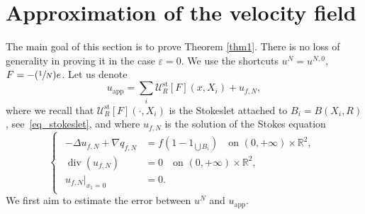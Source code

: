 \documentclass[10pt]{amsart}
\newcommand{\Psfrac}[2]{(\sfrac{#1}{#2})}
\newcommand{\app}{\mathrm{app}}
\newcommand{\st}{\mathrm{st}}
\renewcommand{\div}{\operatorname{div}}
\theoremstyle{plain}
\theoremstyle{definition}
\let\eps\varepsilon
\newcommand{\R}{\mathbb{R}}
\let\oldbigcup\bigcup
\begin{document}
\section{Approximation of the velocity field} \label{sec_approx}

The main goal of this section is to prove Theorem \ref{thm1}. There is no loss of generality in proving it in the case $\eps = 0$. We use the shortcuts $u^N = u^{N,0}$, $F=-\Psfrac{1}{N}e $. Let us denote\vspace*{-3pt}
\[
u_{\app}= \sum_i \mathcal{U}^{\st}_R\left[F\right](x,X_i)+ u_{f,N},
\]
where we recall that $\mathcal{U}^{\st}_R[F](\cdot,X_i)$ is the Stokeslet attached to $B_i=B(X_i,R)$, see~\eqref{eq_stokeslet}, and where $u_{f,N}$ is the solution of the Stokes equation\vspace*{-3pt}
\begin{equation}\label{eq:u_f}
\begin{cases}
\begin{aligned}
-\Delta u_{f,N}+\nabla q_{f,N} &= f (1-1_{\oldbigcup B_i}) \quad\text{on }(0,+\infty)\times \R^2, \\
\div(u_{f,N})&=0 \quad\text{on }(0,+\infty)\times \R^2, \\
u_{f,N}\vert_{x_1=0}&=0.
\end{aligned}
\end{cases}
\end{equation}
We first aim to estimate the error between $u^N$ and
$u_{\app}$.
\end{document}
